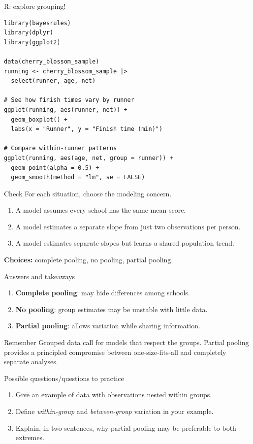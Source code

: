 \documentclass[aspectratio=43,11pt]{beamer}
\begin{document}
\begin{frame}[fragile]{R: explore grouping!}
\scriptsize
\begin{verbatim}
library(bayesrules)
library(dplyr)
library(ggplot2)

data(cherry_blossom_sample)
running <- cherry_blossom_sample |>
  select(runner, age, net)

# See how finish times vary by runner
ggplot(running, aes(runner, net)) +
  geom_boxplot() +
  labs(x = "Runner", y = "Finish time (min)")

# Compare within-runner patterns
ggplot(running, aes(age, net, group = runner)) +
  geom_point(alpha = 0.5) +
  geom_smooth(method = "lm", se = FALSE)
\end{verbatim}
\end{frame}

\begin{frame}{Check}
For each situation, choose the modeling concern.
\begin{enumerate}
\item A model assumes every school has the same mean score.
\item A model estimates a separate slope from just two observations per person.
\item A model estimates separate slopes but learns a shared population trend.
\end{enumerate}
\vspace{5mm}
\textbf{Choices:} complete pooling, no pooling, partial pooling.
\end{frame}

\begin{frame}{Answers and takeaways}
\begin{enumerate}
\item \textbf{Complete pooling}: may hide differences among schools.
\item \textbf{No pooling}: group estimates may be unstable with little data.
\item \textbf{Partial pooling}: allows variation while sharing information.
\end{enumerate}
\vspace{5mm}
\begin{block}{Remember}
Grouped data call for models that respect the groups. Partial pooling provides a principled compromise between one-size-fits-all and completely separate analyses.
\end{block}
\end{frame}

\begin{frame}{Possible questions/questions to practice}
\begin{enumerate}
\item Give an example of data with observations nested within groups.
\item Define \emph{within-group} and \emph{between-group} variation in your example.
\item Explain, in two sentences, why partial pooling may be preferable to both extremes.
\end{enumerate}
\end{frame}
\end{document}
